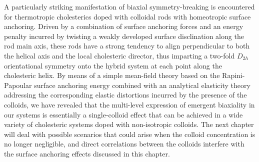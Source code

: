 A particularly striking manifestation of biaxial symmetry-breaking is encountered for thermotropic cholesterics doped with colloidal rods with homeotropic surface anchoring. Driven by a combination of surface anchoring forces and an energy penalty incurred by twisting a weakly developed surface disclination along the rod main axis, these rods have a strong tendency to align perpendicular to both the helical axis and the local cholesteric director, thus imparting a two-fold $D_{2h}$ orientational symmetry onto the hybrid system at each point along the cholesteric helix.
By means of a simple mean-field theory based on the Rapini-Papoular surface anchoring energy combined with an analytical elasticity theory addressing the corresponding elastic distortions incurred by the presence of the colloids, we have revealed that the multi-level expression of emergent biaxiality in our systems is essentially a single-colloid effect that can be achieved in a wide variety of cholesteric systems doped with non-isotropic colloids. The next chapter will deal with possible scenarios that could arise when the colloid concentration is no longer negligible, and direct correlations between the colloids interfere with the surface anchoring effects discussed in this chapter. 




\clearpage